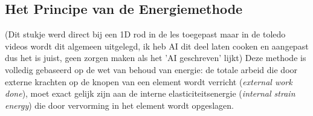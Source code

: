 \documentclass[a4paper,11pt,twoside]{report}
\begin{document}
\subsection{Het Principe van de Energiemethode}
(Dit stukje werd direct bij een 1D rod in de les toegepast maar in de toledo videos wordt dit
algemeen uitgelegd, ik heb AI dit deel laten cooken en aangepast dus het is juist, geen zorgen maken
als het 'AI geschreven' lijkt)
\newline
\newline
Deze methode is volledig gebaseerd op de wet van behoud van energie: de totale arbeid die door
externe krachten op de knopen van een element wordt verricht (\textit{external work done}), moet
exact gelijk zijn aan de interne elasticiteitsenergie (\textit{internal strain energy}) die door
vervorming in het element wordt opgeslagen.
\end{document}
